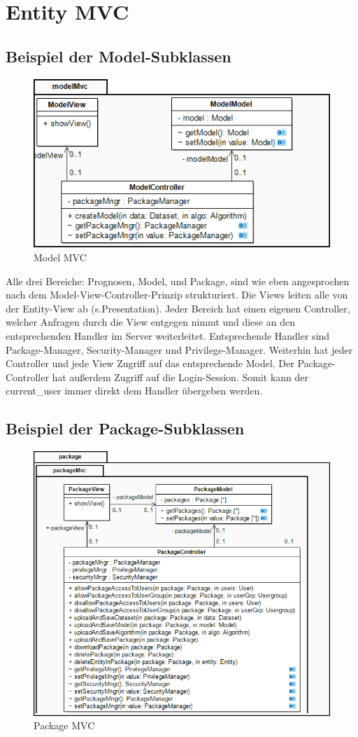 \section{Entity MVC}

\subsection{Beispiel der Model-Subklassen}

\begin{figure}[h]
\centering
\includegraphics[width=0.5\linewidth]{Grafik/Klassendiagramme/Entity_mvc_sub.png}
\caption{Model MVC}
\end{figure}

Alle drei Bereiche: Prognosen, Model, und Package, sind wie eben angesprochen nach dem Model-View-Controller-Prinzip strukturiert. Die Views leiten alle von der Entity-View ab (s.Presentation).
Jeder Bereich hat einen eigenen Controller, welcher Anfragen durch die View entgegen nimmt und diese an den entsprechenden Handler im Server weiterleitet.
Entsprechende Handler sind Package-Manager, Security-Manager und Privilege-Manager. Weiterhin hat jeder Controller und jede View Zugriff auf das entsprechende 
Model. Der Package-Controller hat außerdem Zugriff auf die Login-Session. Somit kann der current\_user immer direkt dem Handler übergeben werden.

\subsection{Beispiel der Package-Subklassen}

\begin{figure}[h]
\centering
\includegraphics[width=0.5\linewidth]{Grafik/Klassendiagramme/Entity_mvc_sub2.png}
\caption{Package MVC}
\end{figure}